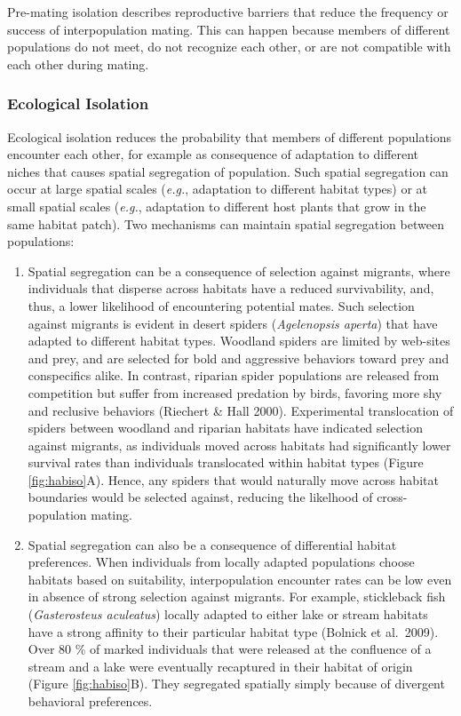 \documentclass[
]{book}
\begin{document}
Pre-mating isolation describes reproductive barriers that reduce the frequency or success of interpopulation mating. This can happen because members of different populations do not meet, do not recognize each other, or are not compatible with each other during mating.

\hypertarget{ecological-isolation}{%
\subsubsection*{Ecological Isolation}\label{ecological-isolation}}

Ecological isolation reduces the probability that members of different populations encounter each other, for example as consequence of adaptation to different niches that causes spatial segregation of population. Such spatial segregation can occur at large spatial scales (\emph{e.g.}, adaptation to different habitat types) or at small spatial scales (\emph{e.g.}, adaptation to different host plants that grow in the same habitat patch). Two mechanisms can maintain spatial segregation between populations:

\begin{enumerate}
\def\labelenumi{(\arabic{enumi})}
\item
  Spatial segregation can be a consequence of selection against migrants, where individuals that disperse across habitats have a reduced survivability, and, thus, a lower likelihood of encountering potential mates. Such selection against migrants is evident in desert spiders (\emph{Agelenopsis aperta}) that have adapted to different habitat types. Woodland spiders are limited by web-sites and prey, and are selected for bold and aggressive behaviors toward prey and conspecifics alike. In contrast, riparian spider populations are released from competition but suffer from increased predation by birds, favoring more shy and reclusive behaviors (Riechert \& Hall 2000). Experimental translocation of spiders between woodland and riparian habitats have indicated selection against migrants, as individuals moved across habitats had significantly lower survival rates than individuals translocated within habitat types (Figure \ref{fig:habiso}A). Hence, any spiders that would naturally move across habitat boundaries would be selected against, reducing the likelhood of cross-population mating.
\item
  Spatial segregation can also be a consequence of differential habitat preferences. When individuals from locally adapted populations choose habitats based on suitability, interpopulation encounter rates can be low even in absence of strong selection against migrants. For example, stickleback fish (\emph{Gasterosteus aculeatus}) locally adapted to either lake or stream habitats have a strong affinity to their particular habitat type (Bolnick et al.~2009). Over 80 \% of marked individuals that were released at the confluence of a stream and a lake were eventually recaptured in their habitat of origin (Figure \ref{fig:habiso}B). They segregated spatially simply because of divergent behavioral preferences.
\end{enumerate}
\end{document}
